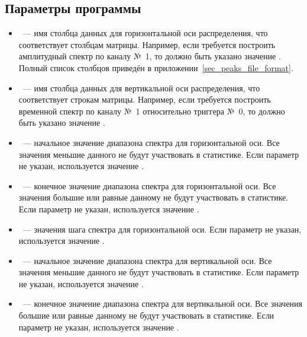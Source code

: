 \bigskip

\noindent {}

\subsection{Параметры программы}
\label{sec-peaks-distr-2d-params}

\begin{itemize}

\item {}~--- имя столбца данных для горизонтальной оси распределения, что соответствует столбцам матрицы. Например, если требуется построить амплитудный спектр по каналу №~1, то должно быть указано значение . Полный список столбцов приведён в приложении~\ref{sec_peaks_file_format}.

\item {}~--- имя столбца данных для вертикальной оси распределения, что соответствует строкам матрицы. Например, если требуется построить временной спектр по каналу №~1 относительно триггера №~0, то должно быть указано значение .

\item {}~--- начальное значение диапазона спектра для горизонтальной оси. Все значения меньшие данного не будут участвовать в статистике. Если параметр не указан, используется значение .

\item {}~--- конечное значение диапазона спектра для горизонтальной оси. Все значения большие или равные данному не будут участвовать в статистике. Если параметр не указан, используется значение .

\item {}~--- значения шага спектра для горизонтальной оси. Если параметр не указан, используется значение .

\item {}~--- начальное значение диапазона спектра для вертикальной оси. Все значения меньшие данного не будут участвовать в статистике. Если параметр не указан, используется значение .

\item {}~--- конечное значение диапазона спектра для вертикальной оси. Все значения большие или равные данному не будут участвовать в статистике. Если параметр не указан, используется значение .


\end{itemize}
